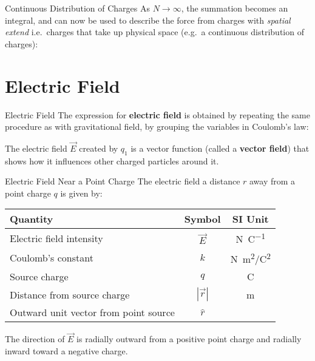 \documentclass[12pt,aspectratio=169]{beamer}
\begin{document}
\begin{frame}{Continuous Distribution of Charges}
  As $N\rightarrow\infty$, the summation becomes an integral, and can now be
  used to describe the force from charges with \emph{spatial extend} i.e.\
  charges that take up physical space (e.g.\ a continuous distribution of
  charges):

\end{frame}



\section{Electric Field}

\begin{frame}{Electric Field}
  The expression for \textbf{electric field} is obtained by repeating the same
  procedure as with gravitational field, by grouping the variables in
  Coulomb's law:


  \vspace{-.15in}The electric field $\vec E$ created by $q_1$ is a vector
  function (called a \textbf{vector field}) that shows how it influences other
  charged particles around it.
\end{frame}



\begin{frame}{Electric Field Near a Point Charge}
  The electric field a distance $r$ away from a point charge $q$ is given by:

  \begin{center}
    \begin{tabular}{l|c|c}
      \rowcolor{pink}
      \textbf{Quantity} & \textbf{Symbol} & \textbf{SI Unit} \\ \hline
      Electric field intensity    & $\vec E$ & \si{\newton\per\coulomb}\\
      Coulomb's constant          & $k$   & \si{N.m^2/C^2} \\
      Source charge               & $q$   & \si{\coulomb} \\
      Distance from source charge & $|\vec r|$   & \si{\metre} \\
      Outward unit vector from point source & $\hat r$ &
    \end{tabular}
  \end{center}
  The direction of $\vec E$ is radially outward from a positive point charge
  and radially inward toward a negative charge.
\end{frame}
\end{document}

